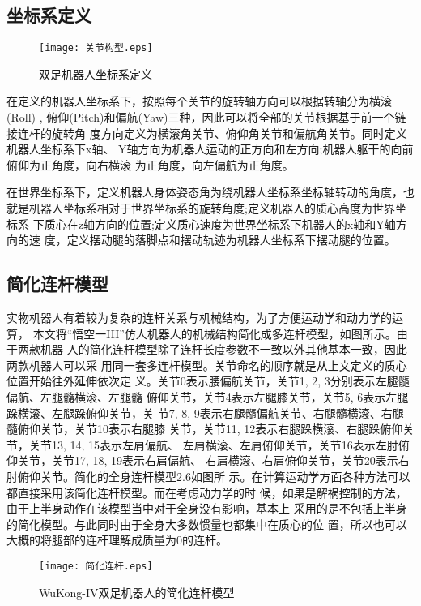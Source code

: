 \subsection{坐标系定义}
\begin{figure}[htbp]
    \centering
    \texttt{[image: 关节构型.eps]}
    \caption{\label{fig:centroid}双足机器人坐标系定义}
\end{figure}
在定义的机器人坐标系下，按照每个关节的旋转轴方向可以根据转轴分为横滚(Roll) ,
俯仰(Pitch)和偏航(Yaw)三种，因此可以将全部的关节根据基于前一个链接连杆的旋转角
度方向定义为横滚角关节、俯仰角关节和偏航角关节。同时定义机器人坐标系下x轴、
Y轴方向为机器人运动的正方向和左方向;机器人躯干的向前俯仰为正角度，向右横滚
为正角度，向左偏航为正角度。

在世界坐标系下，定义机器人身体姿态角为绕机器人坐标系坐标轴转动的角度，也
就是机器人坐标系相对于世界坐标系的旋转角度;定义机器人的质心高度为世界坐标系
下质心在z轴方向的位置;定义质心速度为世界坐标系下机器人的x轴和Y轴方向的速
度，定义摆动腿的落脚点和摆动轨迹为机器人坐标系下摆动腿的位置。
\subsection{简化连杆模型}

实物机器人有着较为复杂的连杆关系与机械结构，为了方便运动学和动力学的运算，
本文将“悟空一III”仿人机器人的机械结构简化成多连杆模型，如图所示。由于两款机器
人的简化连杆模型除了连杆长度参数不一致以外其他基本一致，因此两款机器人可以采
用同一套多连杆模型。关节命名的顺序就是从上文定义的质心位置开始往外延伸依次定
义。关节0表示腰偏航关节，关节1, 2, 3分别表示左腿髓偏航、左腿髓横滚、左腿髓
俯仰关节，关节4表示左腿膝关节，关节5, 6表示左腿跺横滚、左腿跺俯仰关节，关
节7,  8,   9表示右腿髓偏航关节、右腿髓横滚、右腿髓俯仰关节，关节10表示右腿膝
关节，关节11, 12表示右腿跺横滚、右腿跺俯仰关节，关节13, 14, 15表示左肩偏航、
左肩横滚、左肩俯仰关节，关节16表示左肘俯仰关节，关节17, 18, 19表示右肩偏航、
右肩横滚、右肩俯仰关节，关节20表示右肘俯仰关节。简化的全身连杆模型2.6如图所
示。在计算运动学方面各种方法可以都直接采用该简化连杆模型。而在考虑动力学的时
候，如果是解祸控制的方法，由于上半身动作在该模型当中对于全身没有影响，基本上
采用的是不包括上半身的简化模型。与此同时由于全身大多数惯量也都集中在质心的位
置，所以也可以大概的将腿部的连杆理解成质量为0的连杆。

\begin{figure}[htbp]
    \centering
    \texttt{[image: 简化连杆.eps]}
    \caption{\label{fig:link_model}WuKong-IV双足机器人的简化连杆模型}
\end{figure}

